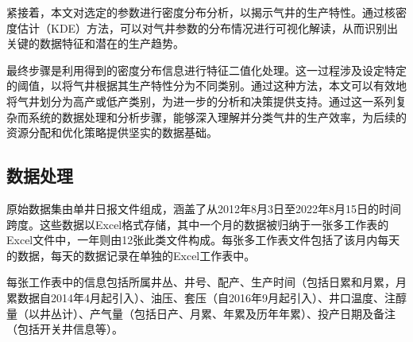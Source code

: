 紧接着，本文对选定的参数进行密度分布分析，以揭示气井的生产特性。通过核密度估计（KDE）方法，可以对气井参数的分布情况进行可视化解读，从而识别出关键的数据特征和潜在的生产趋势。

最终步骤是利用得到的密度分布信息进行特征二值化处理。这一过程涉及设定特定的阈值，以将气井根据其生产特性分为不同类别。通过这种方法，本文可以有效地将气井划分为高产或低产类别，为进一步的分析和决策提供支持。通过这一系列复杂而系统的数据处理和分析步骤，能够深入理解并分类气井的生产效率，为后续的资源分配和优化策略提供坚实的数据基础。
\subsection{数据处理}
\label{cha:data}
原始数据集由单井日报文件组成，涵盖了从2012年8月3日至2022年8月15日的时间跨度。这些数据以Excel格式存储，其中一个月的数据被归纳于一张多工作表的Excel文件中，一年则由12张此类文件构成。每张多工作表文件包括了该月内每天的数据，每天的数据记录在单独的Excel工作表中。

每张工作表中的信息包括所属井丛、井号、配产、生产时间（包括日累和月累，月累数据自2014年4月起引入）、油压、套压（自2016年9月起引入）、井口温度、注醇量（以井丛计）、产气量（包括日产、月累、年累及历年年累）、投产日期及备注（包括开关井信息等）。

